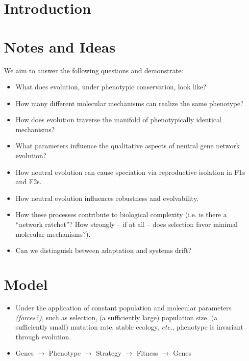 \documentclass[11 pt]{article}
\newcommand{\jss}[1]{{\color{olive}\it #1}}
\newcommand{\1}{\mathbbm{1}}
\begin{document}
\section{Introduction}

\section{Notes and Ideas}

    We aim to answer the following questions and demonstrate:
      \begin{itemize}
        \item What does evolution, under phenotypic conservation, look like?
        \item How many different molecular mechanisms can realize the same phenotype? 
        \item How does evolution traverse the manifold of phenotypically identical mechanisms? 
        \item What parameters influence the qualitative aspects of neutral gene network evolution?
        \item How neutral evolution can cause speciation via reproductive isolation in F1s and F2s. 
        \item How neutral evolution influences robustness and evolvability.
        \item How these processes contribute to biological complexity (i.e. is there a ``network ratchet''? How strongly -- if at all -- does selection favor minimal molecular mechanisms?).
        \item Can we distinguish between adaptation and systems drift?
      \end{itemize}

\section{Model}
    \begin{itemize}
      \item Under the application of constant population and molecular parameters \jss{(forces?)}, such as selection, (a sufficiently large) population size, (a sufficiently small) mutation rate, stable ecology, \emph{etc.}, phenotype is invariant through evolution.
      \item Genes $\rightarrow$ Phenotype $\rightarrow$ Strategy $\rightarrow$ Fitness $\rightarrow$ Genes
    \end{itemize}
\end{document}
